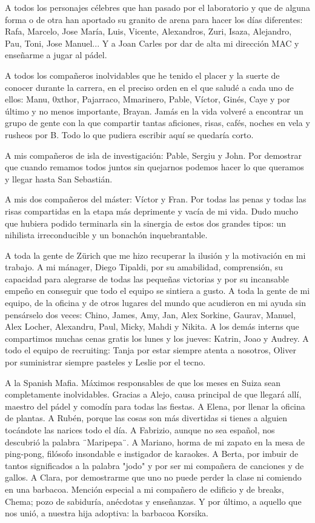 A todos los personajes célebres que han pasado por el laboratorio y que de alguna forma o de otra han aportado su granito de arena para hacer los días diferentes: Rafa, Marcelo, Jose María, Luis, Vicente, Alexandros, Zuri, Isaza, Alejandro, Pau, Toni, Jose Manuel... Y a Joan Carles por dar de alta mi dirección MAC y enseñarme a jugar al pádel.

A todos los compañeros inolvidables que he tenido el placer y la suerte de conocer durante la carrera, en el preciso orden en el que saludé a cada uno de ellos: Manu, 0xthor, Pajarraco, Mmarinero, Pable, Víctor, Ginés, Caye y por último y no menos importante, Brayan. Jamás en la vida volveré a encontrar un grupo de gente con la que compartir tantas aficiones, risas, cafés, noches en vela y rusheos por B. Todo lo que pudiera escribir aquí se quedaría corto.

A mis compañeros de isla de investigación: Pable, Sergiu y John. Por demostrar que cuando remamos todos juntos sin quejarnos podemos hacer lo que queramos y llegar hasta San Sebastián.

A mis dos compañeros del máster: Víctor y Fran. Por todas las penas y todas las risas compartidas en la etapa más deprimente y vacía de mi vida. Dudo mucho que hubiera podido terminarla sin la sinergia de estos dos grandes tipos: un nihilista irreconducible y un bonachón inquebrantable.

A toda la gente de Zürich que me hizo recuperar la ilusión y la motivación en mi trabajo. A mi mánager, Diego Tipaldi, por su amabilidad, comprensión, su capacidad para alegrarse de todas las pequeñas victorias y por su incansable empeño en conseguir que todo el equipo se sintiera a gusto. A toda la gente de mi equipo, de la oficina y de otros lugares del mundo que acudieron en mi ayuda sin pensárselo dos veces: Chino, James, Amy, Jan, Alex Sorkine, Gaurav, Manuel, Alex Locher, Alexandru, Paul, Micky, Mahdi y Nikita. A los demás interns que compartimos muchas cenas gratis los lunes y los jueves: Katrin, Joao y Audrey. A todo el equipo de recruiting: Tanja por estar siempre atenta a nosotros, Oliver por suministrar siempre pasteles y Leslie por el tecno.

A la Spanish Mafia. Máximos responsables de que los meses en Suiza sean completamente inolvidables. Gracias a Alejo, causa principal de que llegará allí, maestro del pádel y comodín para todas las fiestas. A Elena, por llenar la oficina de plantas. A Rubén, porque las cosas son más divertidas si tienes a alguien tocándote las narices todo el día. A Fabrizio, aunque no sea español, nos descubrió la palabra ¨Maripepa¨. A Mariano, horma de mi zapato en la mesa de ping-pong, filósofo insondable e instigador de karaokes. A Berta, por imbuir de tantos significados a la palabra "jodo" y por ser mi compañera de canciones y de gallos. A Clara, por demostrarme que uno no puede perder la clase ni comiendo en una barbacoa. Mención especial a mi compañero de edificio y de breaks, Chema; pozo de sabiduría, anécdotas y enseñanzas. Y por último, a aquello que nos unió, a nuestra hija adoptiva: la barbacoa Korsika.


